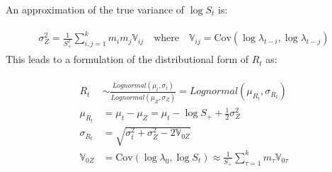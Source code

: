 \documentclass[a4paper, 12pt, twoside]{article}
\begin{document}
An approximation of the true variance of $ \log S_t $ is:

\begin{eqnarray}
\begin{aligned}
\sigma_Z^2 = \frac{1}{S_+^2} \sum_{i,j=1}^k m_i m_j \mathbb{V}_{ij}
\quad \text{where} \quad
\mathbb{V}_{ij} = \text{Cov}(\log \lambda_{t-i}, \log \lambda_{t-j})
\end{aligned}
\end{eqnarray}This leads to a formulation of the distributional form of $R_t$ as:

\begin{eqnarray}
\begin{aligned}
R_t &\sim \frac{Lognormal(\mu_t,\sigma_t)}
{Lognormal( \mu_{Z}, \sigma_{Z})} = Lognormal( \mu_{R_t}, \sigma_{R_t}) \\
\mu_{R_t} &= \mu_t - \mu_{Z} = \mu_t - \log S_+ + \frac{1}{2}\sigma_{Z}^2\\
\sigma_{R_t} &= \sqrt{\sigma_t^2+\sigma_{Z}^2 - 2 \mathbb{V}_{0Z}} \\
\mathbb{V}_{0Z} &= \text{Cov}(\log \lambda_0, \log S_t) \approx \frac{1}{S_+}\sum_{\tau=1}^k m_\tau \mathbb{V}_{0\tau}\\
\end{aligned}
\end{eqnarray}

%
\end{document}
